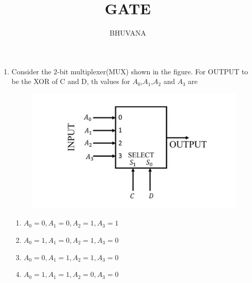 \documentclass{article}
\begin{document}
 \title{GATE}
 \author{BHUVANA}
 \maketitle

 \begin{enumerate}
 \item

	 Consider the $2$-bit multiplexer(MUX) shown in the figure. For OUTPUT to be the XOR of C and D, th values for $A_0$,$A_1$,$A_2$ and $A_3$  are \underline{\hspace{50pt}}
	 \begin{figure}[h]
		 \centering
		 \includegraphics[width=\columnwidth]{pics/gatepic.jpg}
		 \label{fig:MUX}
	\end{figure}
	 \begin{enumerate}[label=(\Alph*)]
		\item $A_0=0,A_1=0,A_2=1,A_3=1$
		\item $A_0=1,A_1=0,A_2=1,A_3=0$
		\item $A_0=0,A_1=1,A_2=1,A_3=0$
		\item $A_0=1,A_1=1,A_2=0,A_3=0$
	\end{enumerate}
 \end{enumerate}
\end{document}
